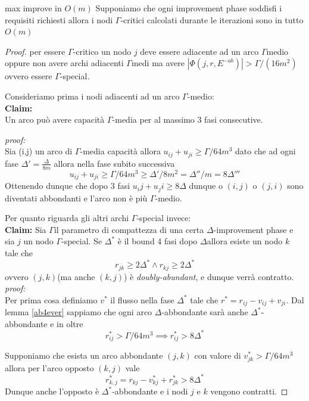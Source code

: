 \documentclass[a4paper, 11pt]{report}
\newcommand{\dlt}{$\Delta$}
\newcommand{\gmm}{$\Gamma$}
\begin{document}
\begin{theo}{max improve in $O(m)$}{}
    Supponiamo che ogni improvement phase soddisfi i requisiti richiesti allora  i nodi \gmm-critici calcolati durante le iterazioni sono in tutto $O(m)$
\end{theo}
\begin{proof}
    per essere \gmm-critico un nodo $j$ deve essere adiacente ad un arco \gmm medio oppure non avere archi adiacenti \gmm medi ma avere $|\Phi (j, r, E^{-ab})| > \Gamma/(16m^2)$ ovvero essere \gmm-special.

    Consideriamo prima i nodi adiacenti ad un arco \gmm-medio:\\
    \textbf{Claim:}\\
    Un arco può avere capacità \gmm-media per al massimo 3 fasi consecutive.

    \textit{proof:}\\
    Sia (i,j) un arco di \gmm-media capacità allora $u_{ij} + u_{ji} \ge \Gamma/64m^3$ dato che ad ogni fase $\Delta' = \frac{\Delta}{8m}$
    allora nella fase subito successiva  \[u_{ij} + u_{ji} \ge \Gamma/64m^3 \ge \Delta'/8m^2 =\Delta''/m = 8\Delta''' \]
    Ottenendo dunque che dopo 3 fasi $u_ij+u_ji \ge 8\Delta$ dunque o $(i,j)$ o $(j,i)$ sono diventati abbondanti e l'arco non è più \gmm-medio.

    Per quanto riguarda gli altri archi \gmm-special invece:\\
    \textbf{Claim:}
    Sia \gmm il parametro di compattezza di una certa \dlt-improvement phase e sia $j$ un nodo \gmm-special.
    Se $\Delta^*$ è il bound 4 fasi dopo \dlt allora esiste un nodo $k$ tale che 
    \[r_{jk}\ge 2\Delta^*\land r_{kj}\ge 2\Delta^* \] 
    ovvero $(j,k)$(ma anche $(k,j)$) è \textit{doubly-abundant}, e dunque verrà contratto.
    \textit{proof:}\\
    Per prima cosa definiamo $v^*$ il flusso nella fase $\Delta^*$ tale che $r^* = r_{ij}-v_{ij}+v_{ji}$.
    Dal lemma \ref{ab4ever} sappiamo che ogni arco \dlt-abbondante sarà anche $\Delta^*$-abbondante e in oltre
    \[r_{ij}^* > \Gamma/64m^3 \implies r_{ij}^*> 8\Delta^*\]

    Supponiamo che esista un arco abbondante $(j,k)$ con valore di $v_{jk}^*>\Gamma/64m^3$ allora per l'arco opposto $(k,j)$ vale
    \[r^*_{k,j}= r_{kj}-v^*_{kj}+r^*_{jk}> 8\Delta^*\]
    Dunque anche l'opposto è $\Delta^*$-abbondante e i nodi $j$ e $k$ vengono contratti.


\end{proof}
\end{document}
